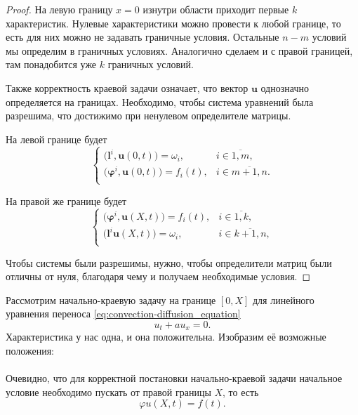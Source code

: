 \documentclass{article}
\begin{document}
\begin{proof}
	На левую границу $x=0$ изнутри области приходит первые $k$
	характеристик. Нулевые характеристики можно провести к любой границе,
	то есть для них можно не задавать граничные условия. Остальные $n-m$
	условий мы определим в граничных условиях. Аналогично сделаем и с правой
	границей, там понадобится уже $k$ граничных условий.

	Также корректность краевой задачи означает, что вектор $\boldsymbol u$
	однозначно определяется на границах. Необходимо, чтобы система уравнений
	была разрешима, что достижимо при ненулевом определителе матрицы.

	На левой границе будет
	\[
	\begin{cases}
		\big(\boldsymbol l^i,\boldsymbol u(0,t)\big)=\omega_i, &
			i\in\overline{1,m}, \\
		\big(\boldsymbol\varphi^i,\boldsymbol u(0,t)\big)=f_i(t), &
			i\in\overline{m+1,n}. \\
	\end{cases}
	\]

	На правой же границе будет
	\[
	\begin{cases}
		\big(\boldsymbol\varphi^i,\boldsymbol u(X,t)\big)=f_i(t), &
			i\in\overline{1,k}, \\
		\big(\boldsymbol l^i\boldsymbol u(X,t)\big)=\omega_i, &
			i\in\overline{k+1,n}, \\
	\end{cases}
	\]

	Чтобы системы были разрешимы, нужно, чтобы определители матриц были
	отличны от нуля, благодаря чему и получаем необходимые условия.
\end{proof}

\begin{example}
	Рассмотрим начально-краевую задачу на границе $[0,X]$ для линейного
	уравнения переноса \eqref{eq:convection-diffusion_equation}
	\[u_t+au_x=0.\]
	Характеристика у нас одна, и она положительна. Изобразим её возможные
	положения: \\

	 \\

	Очевидно, что для корректной постановки начально-краевой задачи
	начальное условие необходимо пускать от правой границы $X$, то есть
	\[\varphi u(X,t)=f(t).\]
\end{example}
\end{document}
